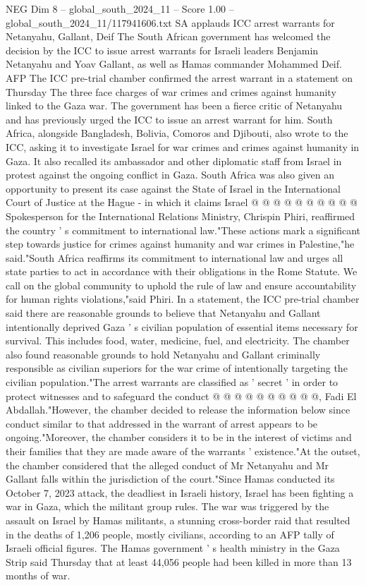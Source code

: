 \begin{textsample}{NEG Dim 8 – global\_south\_2024\_11 – Score 1.00 – global\_south\_2024\_11/117941606.txt}  \label{ex:f8_neg_320}
SA applauds ICC arrest warrants for Netanyahu, Gallant, Deif The South African government has welcomed the decision by the ICC to issue arrest warrants for Israeli leaders Benjamin Netanyahu and Yoav Gallant, as well as Hamas commander Mohammed Deif.
AFP The ICC pre-trial chamber confirmed the arrest warrant in a statement on Thursday The three face charges of war crimes and crimes against humanity linked to the Gaza war.
The government has been a fierce critic of Netanyahu and has previously urged the ICC to issue an arrest warrant for him.
South Africa, alongside Bangladesh, Bolivia, Comoros and Djibouti, also wrote to the ICC, asking it to investigate Israel for war crimes and crimes against humanity in Gaza.
It also recalled its ambassador and other diplomatic staff from Israel in protest against the ongoing conflict in Gaza.
South Africa was also given an opportunity to present its case against the State of Israel in the International Court of Justice at the Hague - in which it claims Israel @ @ @ @ @ @ @ @ @ @ Spokesperson for the International Relations Ministry, Chrispin Phiri, reaffirmed the country ' s commitment to international law."These actions mark a significant step towards justice for crimes against humanity and war crimes in Palestine,"he said."South Africa reaffirms its commitment to international law and urges all state parties to act in accordance with their obligations in the Rome Statute.
We call on the global community to uphold the rule of law and ensure accountability for human rights violations,"said Phiri.
In a statement, the ICC pre-trial chamber said there are reasonable grounds to believe that Netanyahu and Gallant intentionally deprived Gaza ' s civilian population of essential items necessary for survival.
This includes food, water, medicine, fuel, and electricity.
The chamber also found reasonable grounds to hold Netanyahu and Gallant criminally responsible as civilian superiors for the war crime of intentionally targeting the civilian population."The arrest warrants are classified as ' secret ' in order to protect witnesses and to safeguard the conduct @ @ @ @ @ @ @ @ @ @, Fadi El Abdallah."However, the chamber decided to release the information below since conduct similar to that addressed in the warrant of arrest appears to be ongoing."Moreover, the chamber considers it to be in the interest of victims and their families that they are made aware of the warrants ' existence."At the outset, the chamber considered that the alleged conduct of Mr Netanyahu and Mr Gallant falls within the jurisdiction of the court."Since Hamas conducted its October 7, 2023 attack, the deadliest in Israeli history, Israel has been fighting a war in Gaza, which the militant group rules.
The war was triggered by the assault on Israel by Hamas militants, a stunning cross-border raid that resulted in the deaths of 1,206 people, mostly civilians, according to an AFP tally of Israeli official figures.
The Hamas government ' s health ministry in the Gaza Strip said Thursday that at least 44,056 people had been killed in more than 13 months of war.

\end{textsample}
